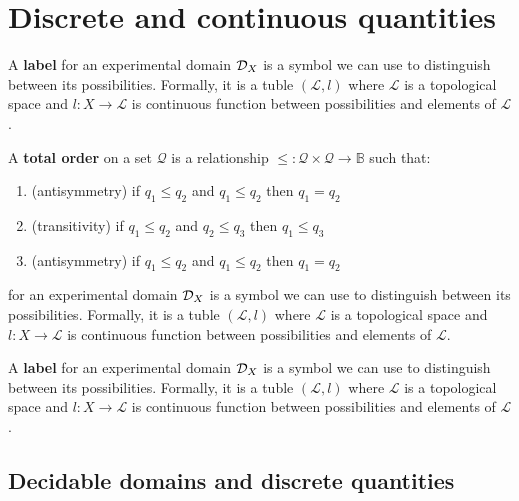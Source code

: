 \documentclass[11pt,letterpaper,fleqn]{memoir} %
\begin{document}
\section{Discrete and continuous quantities}

\begin{mathSection}
	
	\begin{defn}
		A \textbf{label} for an experimental domain $\mathcal{D}_X$ is a symbol we can use to distinguish between its possibilities. Formally, it is a tuble $(\mathcal{L}, l)$ where $\mathcal{L}$ is a topological space and $l : X \to \mathcal{L}$ is continuous function  between possibilities and elements of $\mathcal{L}$.
	\end{defn}
	
	\begin{defn}
		A \textbf{total order} on a set $\mathcal{Q}$ is a relationship $\leq : \mathcal{Q} \times \mathcal{Q} \to \mathbb{B}$ such that:
		\begin{enumerate}
			\item (antisymmetry) if $q_1 \leq q_2$ and $q_1 \leq q_2$ then $q_1 = q_2$
			\item (transitivity) if $q_1 \leq q_2$ and $q_2 \leq q_3$ then $q_1 \leq q_3$
			\item (antisymmetry) if $q_1 \leq q_2$ and $q_1 \leq q_2$ then $q_1 = q_2$
		\end{enumerate}
		
		 for an experimental domain $\mathcal{D}_X$ is a symbol we can use to distinguish between its possibilities. Formally, it is a tuble $(\mathcal{L}, l)$ where $\mathcal{L}$ is a topological space and $l : X \to \mathcal{L}$ is continuous function  between possibilities and elements of $\mathcal{L}$.
	\end{defn}
	
	\begin{defn}
		A \textbf{label} for an experimental domain $\mathcal{D}_X$ is a symbol we can use to distinguish between its possibilities. Formally, it is a tuble $(\mathcal{L}, l)$ where $\mathcal{L}$ is a topological space and $l : X \to \mathcal{L}$ is continuous function  between possibilities and elements of $\mathcal{L}$.
	\end{defn}

\end{mathSection}

\subsection{Decidable domains and discrete quantities}
\end{document}
